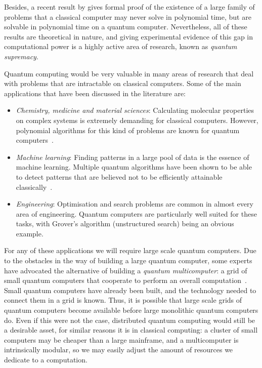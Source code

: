 Besides, a recent result by \citet{BQPSepPH} gives formal proof of the existence of a large family of problems that a classical computer may never solve in polynomial time, but are solvable in polynomial time on a quantum computer. Nevertheless, all of these results are theoretical in nature, and giving experimental evidence of this gap in computational power is a highly active area of research, known as \textit{quantum supremacy}. 

Quantum computing would be very valuable in many areas of research that deal with problems that are intractable on classical computers. Some of the main applications that have been discussed in the literature are:

\begin{itemize}
\item \textit{Chemistry, medicine and material sciences}: Calculating molecular properties on complex systems is extremely demanding for classical computers. However, polynomial algorithms for this kind of problems are known for quantum computers~\citep{TowardsQuantumChemistry}. %
\item \textit{Machine learning}: Finding patterns in a large pool of data is the essence of machine learning. Multiple quantum algorithms have been shown to be able to detect patterns that are believed not to be efficiently attainable classically~\citep{QuantumMachineLearning}.
\item \textit{Engineering}: Optimisation and search problems are common in almost every area of engineering. Quantum computers are particularly well suited for these tasks, with Grover's algorithm (unstructured search) being an obvious example.
\end{itemize}

For any of these applications we will require large scale quantum computers. Due to the obstacles in the way of building a large quantum computer, some experts have advocated the alternative of building a \textit{quantum multicomputer}: a grid of small quantum computers that cooperate to perform an overall computation~\citep{DistributedQCHW}. Small quantum computers have already been built, and the technology needed to connect them in a grid is known. Thus, it is possible that large scale grids of quantum computers become available before large monolithic quantum computers do. Even if this were not the case, distributed quantum computing would still be a desirable asset, for similar reasons it is in classical computing: a cluster of small computers may be cheaper than a large mainframe, and a multicomputer is intrinsically modular, so we may easily adjust the amount of resources we dedicate to a computation.


